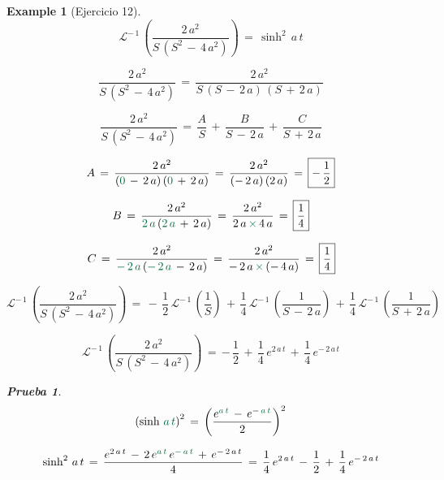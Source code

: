\documentclass[a4paper,11pt,openany]{book}
\newtheorem{prueba}{Prueba}
\newtheorem{exmp}{Example}[section]
\begin{document}
\begin{exmp}[Ejercicio 12]

 
$$\mathcal{L}^{-\,1}\,\left(\dfrac{2\,a^{2}}{S\,(S^{2}\,-\,4\,a^{2})}  \right)\,=\,\sinh^{2}\,a\,t$$
 
\textcolor{cadmiumgreen}{} $$\dfrac{2\,a^{2}}{S\,(S^{2}\,-\,4\,a^{2})}\,=\,\dfrac{2\,a^{2}}{S\,(S\,-\,2\,a)\,(S\,+\,2\,a) }$$
 
\textcolor{cadmiumgreen}{} $$\dfrac{2\,a^{2}}{S\,(S^{2}\,-\,4\,a^{2})}\,=\,\dfrac{A}{S}\,+\,\dfrac{B}{S\,-\,2\,a}\,+\,\dfrac{C}{S\,+\,2\,a}$$
 
$$A\,=\,\dfrac{2\,a^{2}}{(\textcolor{cadmiumgreen}{0 }\,-\,2\,a)\,(\textcolor{cadmiumgreen}{0 }\,+\,2\,a) }\,=\,\dfrac{2\,a^{2}}{(-\,2\,a)\,(2\,a) }\,=\,\boxed{-\,\dfrac{1}{2}}$$
 
$$B\,=\,\dfrac{2\,a^{2}}{\textcolor{cadmiumgreen}{2\,a} \,(\textcolor{cadmiumgreen}{2\,a}\,+\,2\,a) }\,=\,\dfrac{2\,a^{2}}{2\,a\,\textcolor{cadmiumgreen}{\times }\, 4\,a}\,=\,\boxed{\dfrac{1}{4}}$$
 
$$C\,=\,\dfrac{2\,a^{2}}{\textcolor{cadmiumgreen}{-\,2\,a}\,(\textcolor{cadmiumgreen}{-\,2\,a}\,-\,2\,a) }\,=\,\dfrac{2\,a^{2}}{-\,2\,a\,\textcolor{cadmiumgreen}{\times }\, (-\,4\,a)}\,=\,\boxed{\dfrac{1}{4}}$$
 
\textcolor{cadmiumgreen}{} $$\mathcal{L}^{-\,1}\,\left( \dfrac{2\,a^{2}}{S\,(S^{2}\,-\,4\,a^{2})}\right) \,=\,-\,\dfrac{1}{2}\,\mathcal{L}^{-\,1}\,\left( \dfrac{1}{S} \right)\,+\,\dfrac{1}{4}\,\mathcal{L}^{-\,1}\,\left(\dfrac{1}{S\,-\,2\,a} \right) \,+\,\dfrac{1}{4}\,\mathcal{L}^{-\,1}\,\left(\dfrac{1}{S\,+\,2\,a} \right)$$
 
\textcolor{cadmiumgreen}{} $$\mathcal{L}^{-\,1}\,\left( \dfrac{2\,a^{2}}{S\,(S^{2}\,-\,4\,a^{2})}\right) \,=\,\boxed{-\,\dfrac{1}{2}\,+\,\dfrac{1}{4}\,e^{2\,a\,t}\,+\,\dfrac{1}{4}\,e^{-\,2\,a\,t}}$$
 
\begin{prueba}
 
$$\left(\sinh\,\textcolor{cadmiumgreen}{a\,t} \right)^{2}\,=\,\left(\dfrac{e^{\textcolor{cadmiumgreen}{a\,t}}\,-\,e^{-\,\textcolor{cadmiumgreen}{a\,t}}}{2} \right)^{2}$$
 
$$\sinh^{2}\,a\,t\,=\,\dfrac{e^{2\,a\,t}\,-\,2\,e^{\textcolor{cadmiumgreen}{a\,t}}\,e^{\textcolor{cadmiumgreen}{-\,a\,t}}\,+\,e^{-\,2\,a\,t} }{4}\,=\,\dfrac{1}{4}\,e^{2\,a\,t}\,-\,\dfrac{1}{2}\,+\,\dfrac{1}{4}\,e^{-\,2\,a\,t}$$
 
\end{prueba}

\end{exmp}
 
\end{document}
